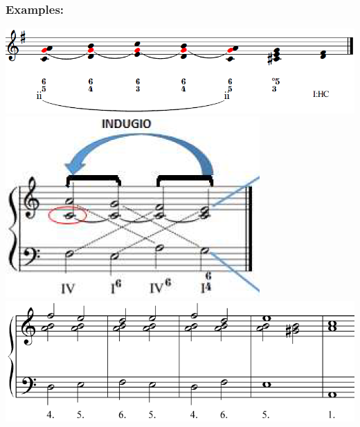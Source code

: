 \documentclass[11pt, openany]{article}
\begin{document}
\subsubsection{Examples:}
\begin{center}
\includegraphics[scale=0.5]{indugio1.png}\\
\includegraphics[scale=0.5]{indugio2.png}\\
\includegraphics[scale=0.5]{indugio3.png}
\end{center}
\end{document}
